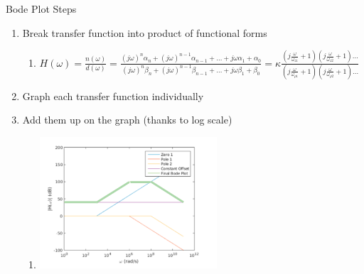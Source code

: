 \documentclass{beamer}
\begin{document}
    \begin{frame}{Bode Plot Steps}
        \begin{enumerate}
            \item Break transfer function into product of functional forms
            \begin{enumerate}
                \item $H(\omega) = \frac{n(\omega)}{d(\omega)} = \frac{(j\omega)^n\alpha_{n} + (j\omega)^{n-1}\alpha_{n-1} + \ldots  + j \omega \alpha_1 + \alpha_0}{(j\omega)^n\beta_{n} + (j\omega)^{n-1}\beta_{n-1} + \ldots  + j \omega \beta_1 + \beta_0} = \kappa \frac{(j\frac{\omega}{\omega_{z1}} +1)(j\frac{\omega}{\omega_{z2}} +1) \ldots}{(j\frac{\omega}{\omega_{\rho1}} +1)(j\frac{\omega}{\omega_{\rho2}} +1) \ldots}$
            \end{enumerate}
            \item Graph each transfer function individually
            \item Add them up on the graph (thanks to log scale)
            \begin{enumerate}
                \item \includegraphics[scale=0.5]{bode-plot-steps-1.png}
            \end{enumerate}
        \end{enumerate}
    \end{frame}
\end{document}

